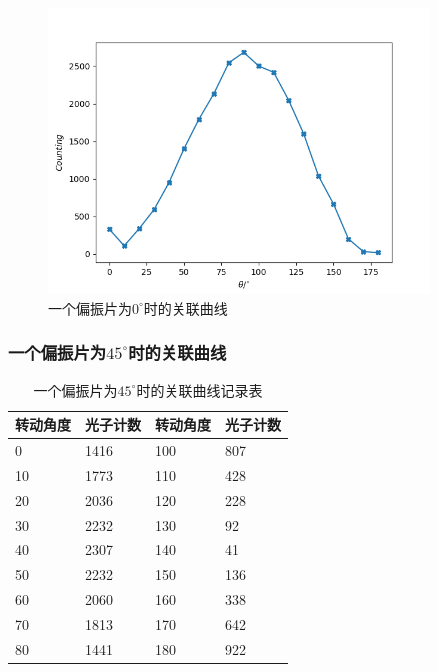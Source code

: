 \documentclass[a4paper,UTF8]{ctexart}
\begin{document}
\begin{figure}[H]
    \centering
    \begin{minipage}[b]{0.9\textwidth}
        \centering
        \includegraphics[width=0.9\textwidth]{./1.png}
        \caption{一个偏振片为$0^{\circ}$时的关联曲线}
        \label{1}
    \end{minipage}
\end{figure}

\subsubsection{一个偏振片为$45^{\circ}$时的关联曲线}

\begin{table}[H]
    \centering
    \caption{一个偏振片为$45^{\circ}$时的关联曲线记录表}
    \begin{tabular}{|l|l|l|l|}
    \hline
        \textbf{转动角度} & \textbf{光子计数} & \textbf{转动角度} & \textbf{光子计数} \\ \hline
        0 & 1416 & 100 & 807 \\ \hline
        10 & 1773 & 110 & 428 \\ \hline
        20 & 2036 & 120 & 228 \\ \hline
        30 & 2232 & 130 & 92 \\ \hline
        40 & 2307 & 140 & 41 \\ \hline
        50 & 2232 & 150 & 136 \\ \hline
        60 & 2060 & 160 & 338 \\ \hline
        70 & 1813 & 170 & 642 \\ \hline
        80 & 1441 & 180 & 922 \\ \hline
    \end{tabular}
\end{table}
\end{document}

